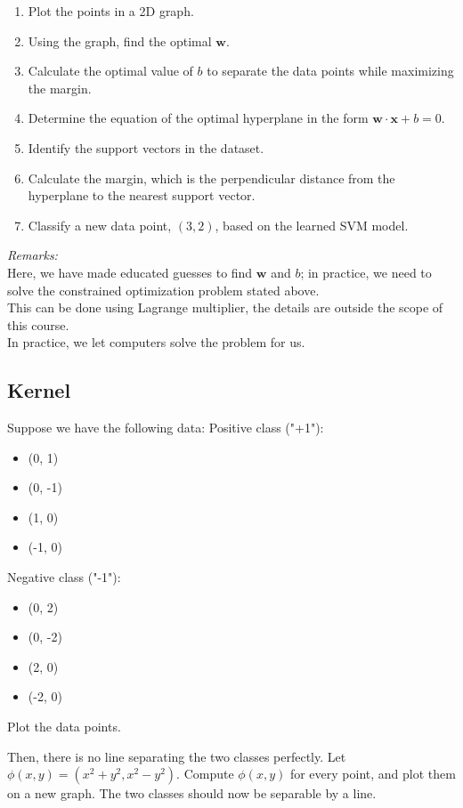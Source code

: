 \documentclass[]{article}
\begin{document}
	\begin{enumerate}
		\item Plot the points in a 2D graph.
		\item Using the graph, find the optimal $\mathbf{w}$.
		\item Calculate the optimal value of \(b\) to separate the data points while maximizing the margin.
		\item Determine the equation of the optimal hyperplane in the form \(\mathbf{w}\cdot\mathbf{x} + b = 0\).
		\item Identify the support vectors in the dataset.
		\item Calculate the margin, which is the perpendicular distance from the hyperplane to the nearest support vector.
		\item Classify a new data point, \((3, 2)\), based on the learned SVM model.
	\end{enumerate}
	\textit{Remarks:}\\
	Here, we have made educated guesses to find $\mathbf{w}$ and $b$; in practice, we need to solve the constrained optimization problem stated above.\\
	This can be done using Lagrange multiplier, the details are outside the scope of this course.\\
	In practice, we let computers solve the problem for us.
	
	
	
	\subsection{Kernel}
	Suppose we have the following data:
	Positive class ("+1"):
	\begin{itemize}
		\item (0, 1)
		\item (0, -1)
		\item (1, 0)
		\item (-1, 0)
	\end{itemize}
	Negative class ("-1"):
	\begin{itemize}
		\item (0, 2)
		\item (0, -2)
		\item (2, 0)
		\item (-2, 0)
	\end{itemize}
	Plot the data points.
	
	\vspace{0.5cm}
	
	Then, there is no line separating the two classes perfectly.
	Let $\phi(x,y) = (x^2 + y^2, x^2-y^2)$.
	Compute $\phi(x,y)$ for every point, and plot them on a new graph.
	The two classes should now be separable by a line.
	
\end{document}
